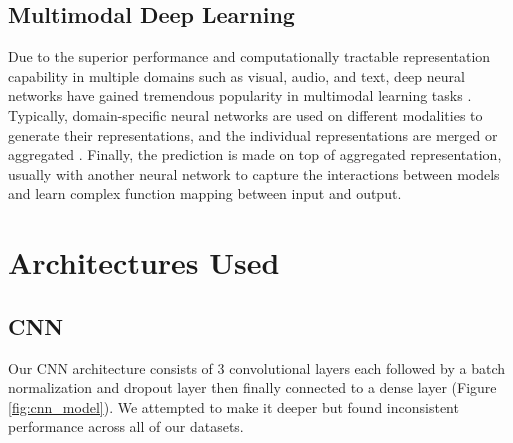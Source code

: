 \documentclass{turabian-thesis}
\begin{document}
\subsection{Multimodal Deep Learning}

Due to the superior performance and computationally tractable representation capability in multiple domains such as visual, audio, and text, deep neural networks have gained tremendous popularity in multimodal learning tasks \cite{kim_multimodal_2018}. Typically, domain-specific neural networks are used on different modalities to generate their representations, and the individual representations are merged or aggregated \cite{kim_multimodal_2018}. Finally, the prediction is made on top of aggregated representation, usually with another neural network to capture the interactions between models and learn complex function mapping between input and output.


\section{Architectures Used}

\subsection{CNN}

Our CNN architecture consists of 3 convolutional layers each followed by a batch normalization and dropout layer then finally connected to a dense layer (Figure \ref{fig:cnn_model}). We attempted to make it deeper but found inconsistent performance across all of our datasets.
\end{document}
